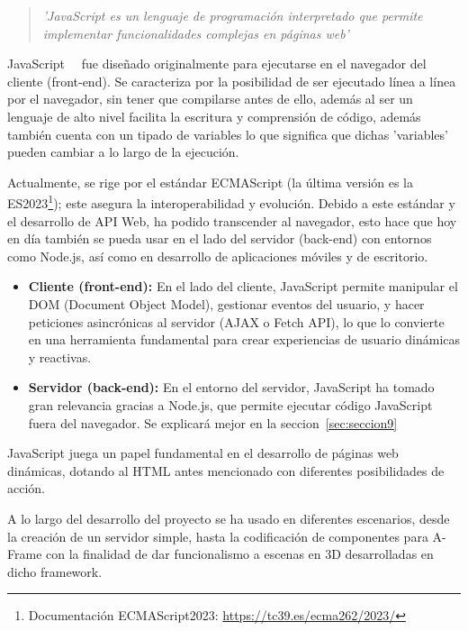 \documentclass[a4paper, 12pt]{book}
\begin{document}
\begin{quote}
  \textit{'JavaScript es un lenguaje de programación interpretado que permite implementar funcionalidades complejas en páginas web' \cite{mdn_javascript_intro_es}}
\end{quote}


JavaScript~\cite{mdn_javascript_data_structures}~\cite{flanagan2002javascript} fue diseñado originalmente para ejecutarse en el navegador del cliente (front-end). 
Se caracteriza por la posibilidad de ser ejecutado línea a línea por el navegador, sin tener que compilarse antes de ello, además al ser un lenguaje de alto nivel facilita la escritura y comprensión de código, además también cuenta con un tipado de variables lo que significa que dichas 'variables' pueden cambiar a lo largo de la ejecución. 

Actualmente, se rige por el estándar ECMAScript (la última versión es la ES2023\footnote{Documentación ECMAScript2023: \scriptsize\url{https://tc39.es/ecma262/2023/}}); este asegura la interoperabilidad y evolución. Debido a este estándar y el desarrollo de API Web, ha podido transcender al navegador,
esto hace que hoy en día también se pueda usar en el lado del servidor (back-end) con entornos como Node.js, así como en desarrollo de aplicaciones móviles y de escritorio.

\begin{itemize}
 \item \textbf{Cliente (front-end):}
 En el lado del cliente, JavaScript permite manipular el DOM (Document Object Model), gestionar eventos del usuario, y hacer peticiones asincrónicas al servidor (AJAX o Fetch API), lo que lo convierte en una herramienta fundamental para crear experiencias de usuario dinámicas y reactivas.
 \item \textbf{Servidor (back-end):}
 En el entorno del servidor, JavaScript ha tomado gran relevancia gracias a Node.js, que permite ejecutar código JavaScript fuera del navegador. Se explicará mejor en la seccion~\ref{sec:seccion9}
\end{itemize}

JavaScript juega un papel fundamental en el desarrollo de páginas web dinámicas, dotando al HTML antes mencionado con diferentes posibilidades de acción.

A lo largo del desarrollo del proyecto se ha usado en diferentes escenarios, desde la creación de un servidor simple, hasta la codificación de componentes para A-Frame con la finalidad de dar funcionalismo a escenas en 3D desarrolladas en dicho framework. 
\end{document}
